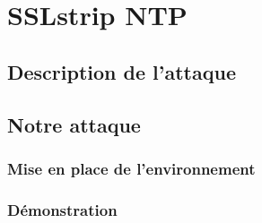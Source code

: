 \chapter{SSLstrip NTP}

\section{Description de l'attaque}

\section{Notre attaque}

\subsection{Mise en place de l'environnement}

\subsection{Démonstration}
